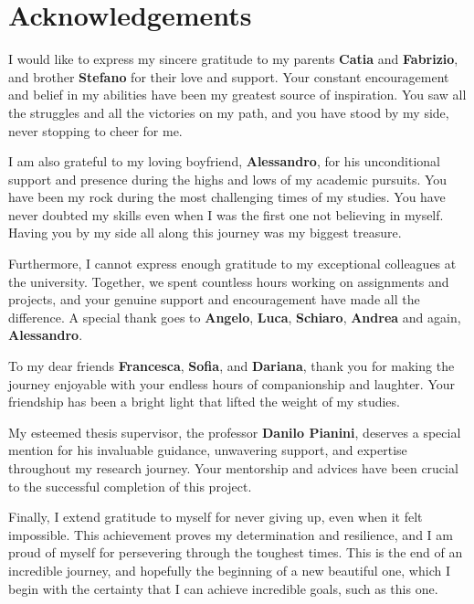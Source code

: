 \chapter*{Acknowledgements}
I would like to express my sincere gratitude to my parents \textbf{Catia} and \textbf{Fabrizio}, and brother \textbf{Stefano} for their love and support. Your constant encouragement and belief in my abilities have been my greatest source of inspiration. You saw all the struggles and all the victories on my path, and you have stood by my side, never stopping to cheer for me.

I am also grateful to my loving boyfriend, \textbf{Alessandro}, for his unconditional support and presence during the highs and lows of my academic pursuits. You have been my rock during the most challenging times of my studies. You have never doubted my skills even when I was the first one not believing in myself. Having you by my side all along this journey was my biggest treasure.

Furthermore, I cannot express enough gratitude to my exceptional colleagues at the university. Together, we spent countless hours working on assignments and projects, and your genuine support and encouragement have made all the difference. A special thank goes to \textbf{Angelo}, \textbf{Luca}, \textbf{Schiaro}, \textbf{Andrea} and again, \textbf{Alessandro}.

To my dear friends \textbf{Francesca}, \textbf{Sofia}, and \textbf{Dariana}, thank you for making the journey enjoyable with your endless hours of companionship and laughter. Your friendship has been a bright light that lifted the weight of my studies.

My esteemed thesis supervisor, the professor \textbf{Danilo Pianini}, deserves a special mention for his invaluable guidance, unwavering support, and expertise throughout my research journey. Your mentorship and advices have been crucial to the successful completion of this project.

Finally, I extend gratitude to myself for never giving up, even when it felt impossible. This achievement proves my determination and resilience, and I am proud of myself for persevering through the toughest times. This is the end of an incredible journey, and hopefully the beginning of a new beautiful one, which I begin with the certainty that I can achieve incredible goals, such as this one.